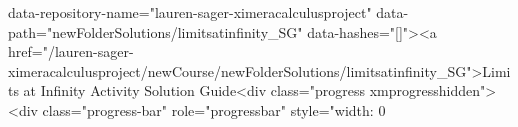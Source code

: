 data-repository-name="lauren-sager-ximeracalculusproject" data-path="newFolderSolutions/limitsatinfinity_SG" data-hashes="[]"><a href="/lauren-sager-ximeracalculusproject/newCourse/newFolderSolutions/limitsatinfinity_SG">Limits at Infinity Activity Solution Guide<div class="progress xmprogresshidden"><div class="progress-bar" role="progressbar" style="width: 0%